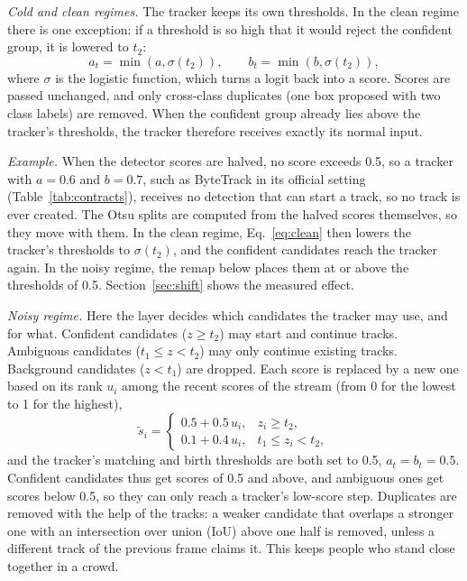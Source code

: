 \documentclass[pdflatex,sn-mathphys-num,iicol]{sn-jnl}
\begin{document}
\emph{Cold and clean regimes.} The tracker keeps its own thresholds. In
the clean regime there is one exception: if a threshold is so high that it
would reject the confident group, it is lowered to $t_2$:
\begin{equation}
a_t=\min\!\left(a,\sigma(t_2)\right),\qquad b_t=\min\!\left(b,\sigma(t_2)\right),
\label{eq:clean}
\end{equation}
where $\sigma$ is the logistic function, which turns a logit back into a
score. Scores are passed unchanged, and only cross-class duplicates (one box
proposed with two class labels) are removed. When the confident group
already lies above the tracker's thresholds, the tracker therefore receives
exactly its normal input.

\emph{Example.} When the detector scores are halved, no score exceeds 0.5, so
a tracker with $a=0.6$ and $b=0.7$, such as ByteTrack in its official setting
(Table~\ref{tab:contracts}), receives no detection that can start a track,
so no track is ever created. The Otsu splits are computed from the halved scores themselves, so
they move with them. In the clean regime, Eq.~\eqref{eq:clean} then lowers
the tracker's thresholds to $\sigma(t_2)$, and the confident candidates reach
the tracker again. In the noisy regime, the remap below places them at or
above the thresholds of 0.5. Section~\ref{sec:shift} shows the measured effect.

\emph{Noisy regime.} Here the layer decides which candidates the tracker
may use, and for what. Confident candidates ($z\ge t_2$) may start and
continue tracks. Ambiguous candidates ($t_1\le z<t_2$) may only continue
existing tracks. Background candidates ($z<t_1$) are dropped. Each score is
replaced by a new one based on its rank $u_i$ among the recent scores of the
stream (from 0 for the lowest to 1 for the highest),
\begin{equation}
\tilde{s}_i=
\begin{cases}
0.5+0.5\,u_i, & z_i\ge t_2,\\
0.1+0.4\,u_i, & t_1\le z_i<t_2,
\end{cases}
\label{eq:remap}
\end{equation}
and the tracker's matching and birth thresholds are both set to 0.5,
$a_t=b_t=0.5$. Confident candidates thus get scores of 0.5 and above, and
ambiguous ones get scores below 0.5, so they can only reach a tracker's
low-score step. Duplicates are removed with the help of the tracks: a weaker
candidate that overlaps a stronger one with an intersection over union (IoU)
above one half is removed, unless a different track of the previous frame
claims it. This keeps people who stand close together in a crowd.
\end{document}
